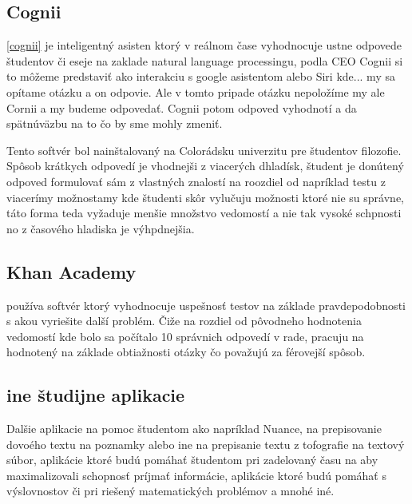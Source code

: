 \documentclass[10pt,oneside,slovak,a4paper]{article}
\begin{document}

\subsection{Cognii}
\ref{cognii}
je inteligentný asisten ktorý v reálnom čase vyhodnocuje ustne odpovede študentov či eseje na zaklade natural language processingu, podla CEO Cognii si to môžeme predstaviť ako interakciu s google asistentom alebo Siri kde... my sa opítame otázku a on odpovie. Ale v tomto pripade otázku nepoložíme my ale Cornii a my budeme odpovedať. Cognii potom odpoved vyhodnotí a da spätnúväzbu na to čo by sme mohly zmeniť. 

Tento softvér bol nainštalovaný na Colorádsku univerzitu pre študentov filozofie. 
Spôsob krátkych odpovedí je vhodnejši z viacerých dhladísk, študent je donútený odpoved formulovať sám z vlastných znalostí na roozdiel od napríklad testu z viacerímy možnostamy kde študenti skôr vylučuju možnosti ktoré nie su správne, táto forma  teda vyžaduje menšie množstvo vedomostí a nie tak vysoké schpnosti no z časového hladiska je výhpdnejšia. 

\subsection{Khan Academy}
používa softvér ktorý vyhodnocuje uspešnosť testov na základe pravdepodobnosti s akou vyriešite další problém.  Čiže na rozdiel od pôvodneho hodnotenia vedomostí kde bolo sa počítalo 10 správnich odpovedí v rade, pracuju na hodnotený na základe obtiažnosti otázky čo považujú za férovejší spôsob.\label{khan_academy_learning}


\subsection{ine študijne aplikacie}
Dalšie aplikacie na pomoc študentom ako napríklad Nuance, na prepisovanie dovoého textu na poznamky alebo ine na prepisanie textu z tofografie na textový súbor, aplikácie ktoré budú pomáhať študentom pri zadelovaný času na aby maximalizovali schopnosť príjmať informácie, aplikácie ktoré budú pomáhať s výslovnostov či pri riešený matematických problémov a mnohé iné.
\end{document}
